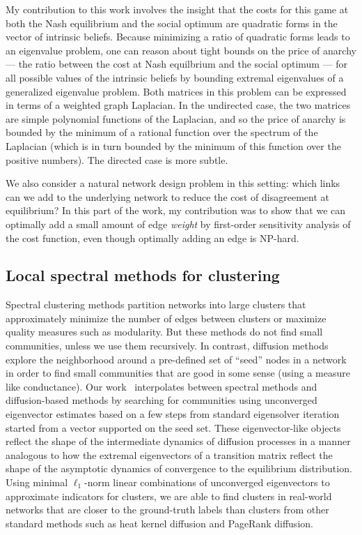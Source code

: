 \documentclass{amsart}
\begin{document}
My contribution to this work involves the insight that the costs
for this game at both the Nash equilibrium and the social optimum are
quadratic forms in the vector of intrinsic beliefs.
Because minimizing a ratio of quadratic forms leads to an eigenvalue
problem, one can reason about tight bounds on the price of anarchy ---
the ratio between the cost at Nash equilbrium and the social optimum ---
for all possible values of the intrinsic beliefs by bounding extremal
eigenvalues of a generalized eigenvalue problem.
Both matrices in this problem can be expressed in terms of a
weighted graph Laplacian.  In the undirected case, the two matrices are
simple polynomial functions of the Laplacian, and so the price of
anarchy is bounded by the minimum of a rational function over the
spectrum of the Laplacian (which is in turn bounded by the minimum of
this function over the positive numbers).  The directed case is more subtle.

We also consider a natural network design problem in this setting: which
links can we add to the underlying network to reduce the cost of
disagreement at equilibrium? In this part of the work, my contribution
was to show that we can optimally add a small amount of edge {\em weight}
by first-order sensitivity analysis of the cost function, even though
optimally adding an edge is NP-hard.

\subsection*{Local spectral methods for clustering}

Spectral clustering methods partition networks into large
clusters that approximately minimize the number of edges between
clusters or maximize quality measures such as modularity. But these
methods do not find small communities, unless we use them
recursively.
In contrast, diffusion methods explore the neighborhood around a
pre-defined set of ``seed'' nodes in a network in order to find small
communities that are good in some sense (using a measure like
conductance).  Our work~\cite{2016-losp-kdd,2015-icdm,2015-www}
interpolates between spectral methods and diffusion-based
methods by searching for communities using unconverged eigenvector
estimates based on a few steps from standard eigensolver iteration
started from a vector supported on the seed set. These eigenvector-like
objects reflect the shape of the intermediate dynamics of diffusion
processes in a manner analogous to how the extremal eigenvectors of a
transition matrix reflect the shape of the asymptotic dynamics of
convergence to the equilibrium distribution.  Using minimal
$\ell_1$-norm linear combinations of unconverged eigenvectors
to approximate indicators for clusters, we are able to find
clusters in real-world networks that are closer to the ground-truth
labels than clusters from other standard methods such
as heat kernel diffusion and PageRank diffusion.
\end{document}
